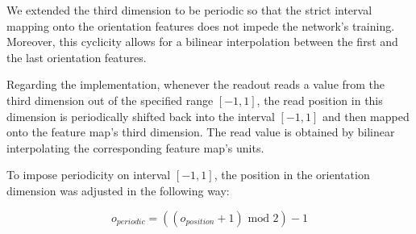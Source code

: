 We extended the third dimension to be periodic so that the strict interval mapping onto the orientation features does not impede the network’s training. Moreover, this cyclicity allows for a bilinear interpolation between the first and the last orientation features.

Regarding the implementation, whenever the readout reads a value from the third dimension out of the specified range $[-1, 1]$, the read position in this dimension is periodically shifted back into the interval $[-1, 1]$ and then mapped onto the feature map’s third dimension. The read value is obtained by bilinear interpolating the corresponding feature map’s units.

To impose periodicity on interval $[-1, 1]$, the position in the orientation dimension was adjusted in the following way:

\begin{equation}
o_{periodic} = ((o_{position} + 1) \text{ mod } 2) - 1
\end{equation}



